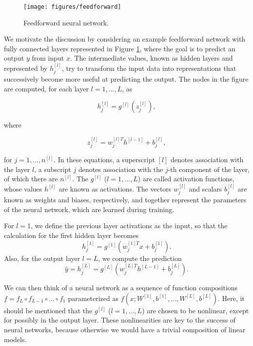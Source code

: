 \documentclass[risks,article,submit,moreauthors,pdftex]{mdpi}
\begin{document}
\begin{figure}

{\centering \texttt{[image: figures/feedforward]} 

}

\caption{Feedforward neural network.}\label{fig:feedforward}
\end{figure}

We motivate the discussion by considering an example feedforward network with fully connected layers represented in Figure \ref{fig:feedforward}, where the goal is to predict an output \(y\) from input \(x\). The intermediate values, known as hidden layers and represented by \(h_j^{[l]}\), try to transform the input data into representations that successively become more useful at predicting the output. The nodes in the figure are computed, for each layer \(l = 1, \dots, L\), as

\begin{equation}
h_j^{[l]} = g^{[l]}(z_j^{[l]}),
\end{equation}

where

\begin{equation}
z_j^{[l]} = w_j^{[l]T}h^{[l-1]}+ b_j^{[l]},
\end{equation}

for \(j = 1, \dots, n^{[l]}\). In these equations, a superscript \([l]\) denotes association with the layer \(l\), a subscript \(j\) denotes association with the \(j\)-th component of the layer, of which there are \(n^{[l]}\). The \(g^{[l]}\) (\(l = 1, \dots, L\)) are called activation functions, whose values \(h^{[l]}\) are known as activations. The vectors \(w_j^{[l]}\) and scalars \(b_j^{[l]}\) are known as weights and biases, respectively, and together represent the parameters of the neural network, which are learned during training.

For \(l = 1\), we define the previous layer activations as the input, so that the calculation for the first hidden layer becomes
\begin{equation}
h_j^{[1]} = g^{[1]}(w_j^{[1]T}x + b_j^{[1]}).
\end{equation}
Also, for the output layer \(l = L\), we compute the prediction
\begin{equation}
\hat{y} = h_j^{[L]} = g^{[L]}(w_{j}^{[L]T}h^{[L-1]} + b_j^{[L]}).
\end{equation}

We can then think of a neural network as a sequence of function compositions \(f = f_L \circ f_{L-1} \circ \dots \circ f_1\) parameterized as \(f(x; W^{[1]}, b^{[1]}, \dots, W^{[L]}, b^{[L]})\). Here, it should be mentioned that the \(g^{[l]}\) (\(l = 1, \dots, L\)) are chosen to be nonlinear, except for possibly in the output layer. These nonlinearities are key to the success of neural networks, because otherwise we would have a trivial composition of linear models.
\end{document}
